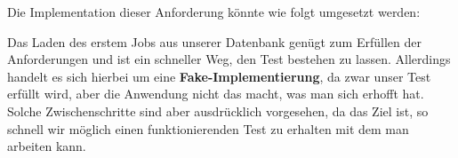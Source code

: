 Die Implementation dieser Anforderung könnte wie folgt umgesetzt werden:
%                                                                                                                                                                    
%                                                                                                                                                                    
\begin{ruby}[label=app/controllers/jobs\_controller.rb]
   
   
      
\end{ruby}

\tddgreen
Das Laden des erstem Jobs aus unserer Datenbank genügt zum Erfüllen der Anforderungen und ist ein schneller Weg, den Test bestehen zu lassen. Allerdings handelt es sich hierbei um eine \textbf{Fake-Implementierung}, da zwar unser Test erfüllt wird, aber die Anwendung nicht das macht, was man sich erhofft hat. Solche Zwischenschritte sind aber ausdrücklich vorgesehen, da das Ziel ist, so schnell wir möglich einen funktionierenden Test zu erhalten mit dem man arbeiten kann.

